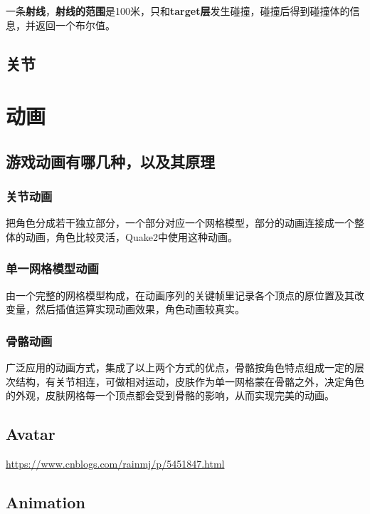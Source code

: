 \documentclass[UTF8,a4paper,12pt]{ctexbook}
\begin{document}
			一条\textbf{射线}，\textbf{射线的范围}是100米，只和\textbf{target层}发生碰撞，碰撞后得到碰撞体的信息，并返回一个布尔值。
	
	\section{关节}
		
\chapter{动画}
	\section{游戏动画有哪几种，以及其原理}
		\subsection{关节动画}
			把角色分成若干独立部分，一个部分对应一个网格模型，部分的动画连接成一个整体的动画，角色比较灵活，Quake2中使用这种动画。 
			
		\subsection{单一网格模型动画}
			由一个完整的网格模型构成，在动画序列的关键帧里记录各个顶点的原位置及其改变量，然后插值运算实现动画效果，角色动画较真实。   
			
		\subsection{骨骼动画}
			广泛应用的动画方式，集成了以上两个方式的优点，骨骼按角色特点组成一定的层次结构，有关节相连，可做相对运动，皮肤作为单一网格蒙在骨骼之外，决定角色的外观，皮肤网格每一个顶点都会受到骨骼的影响，从而实现完美的动画。
	
	\section{Avatar}
	
		\url{https://www.cnblogs.com/rainmj/p/5451847.html}
		
	\section{Animation}
		
\end{document}
